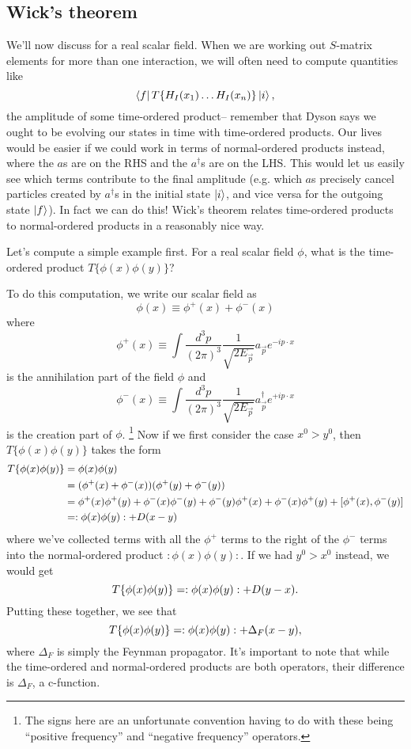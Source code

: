 \subsection*{Wick's theorem} We'll now discuss  for a real scalar field. When we are working out $S$-matrix elements for more than one interaction, we will often need to compute quantities like
$$\left< f \right|T\{H_I(x_1)\ldots H_I(x_n)\}\left| i \right>,$$
the amplitude of some time-ordered product-- remember that Dyson says we ought to be evolving our states in time with time-ordered products. Our lives would be easier if we could work in terms of normal-ordered products instead, where the $a$s are on the RHS and the $a^\dagger$s are on the LHS. This would let us easily see which terms contribute to the final amplitude (e.g. which $a$s precisely cancel particles created by $a^\dagger$s in the initial state $\left| i \right>$, and vice versa for the outgoing state $\left| f \right>$). In fact we can do this! Wick's theorem relates time-ordered products to normal-ordered products in a reasonably nice way.

Let's compute a simple example first.
For a real scalar field $\phi$, what is the time-ordered product $T\{\phi(x)\phi(y)\}$?
    
To do this computation, we write our scalar field as
$$\phi(x)\equiv \phi^+(x)+\phi^-(x)$$
where
$$\phi^+ (x)\equiv \int \frac{d^3p}{(2\pi)^3}\frac{1}{\sqrt{2E_{\vec p}}} a_{\vec p} e^{-ip\cdot x}$$
is the annihilation part of the field $\phi$ and
$$\phi^-(x)\equiv \int \frac{d^3p}{(2\pi)^3}\frac{1}{\sqrt{2E_{\vec p}}} a_{\vec p}^\dagger e^{+ip\cdot x}$$
is the creation part of $\phi$.%
    \footnote{The signs here are an unfortunate convention having to do with these being ``positive frequency'' and ``negative frequency'' operators.}
%
Now if we first consider the case $x^0>y^0$, then $T\{\phi(x)\phi(y)\}$ takes the form
\begin{align*}
    T\{\phi(x)\phi(y)\}&=\phi(x)\phi(y)\\
    &=(\phi^+(x)+\phi^-(x))(\phi^+(y)+\phi^-(y))\\
    &=\phi^+(x)\phi^+(y)+\phi^-(x)\phi^-(y)+\phi^-(y)\phi^+(x)+\phi^-(x)\phi^+(y)+[\phi^+(x),\phi^-(y)]\\
    &=:\phi(x)\phi(y):+D(x-y)
\end{align*}
where we've collected terms with all the $\phi^+$ terms to the right of the $\phi^-$ terms into the normal-ordered product $:\phi(x)\phi(y):$. If we had $y^0>x^0$ instead, we would get
$$T\{\phi(x)\phi(y)\}=:\phi(x)\phi(y):+D(y-x).$$
Putting these together, we see that
\begin{equation}
    T\{\phi(x)\phi(y)\}=:\phi(x)\phi(y):+\Delta_F(x-y), 
\end{equation}
where $\Delta_F$ is simply the Feynman propagator. It's important to note that while the time-ordered and normal-ordered products are both operators, their difference is $\Delta_F$, a c-function.

